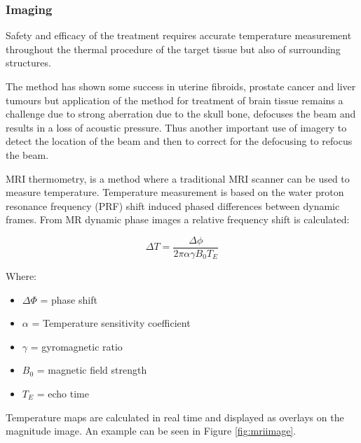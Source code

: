 \documentclass[11pt]{article} %
\begin{document}
	\subsubsection{Imaging}
	Safety and efficacy of the treatment requires accurate temperature measurement throughout the thermal procedure of the target tissue but also of surrounding structures.
	
	The method has shown some success in uterine fibroids, prostate cancer and liver tumours but application of the method for treatment of brain tissue remains a challenge due to strong aberration due to the skull bone, defocuses the beam and results in a loss of acoustic pressure. Thus another important use of imagery to detect the location of the beam and then to correct for the defocusing to refocus the beam. 
	
	MRI thermometry, is a method where a traditional MRI scanner can be used to measure temperature. Temperature measurement is based on the water proton resonance frequency (PRF) shift induced phased differences between dynamic frames. From MR dynamic phase images a relative frequency shift is calculated:
	
	\begin{equation}
	\Delta T= \frac{\Delta \phi}{2 \pi \alpha \gamma B_0 T_E}
	\end{equation}
	
	Where: 
	\begin{itemize}
		\item $\Delta \Phi $ = phase shift 
		\item $\alpha$ = Temperature sensitivity coefficient 
		\item $\gamma$ = gyromagnetic ratio
		\item $B_0$ = magnetic field strength
		\item $T_E$ = echo time 
	\end{itemize}

	Temperature maps are calculated in real time and displayed as overlays on the magnitude image. An example can be seen in Figure \ref{fig:mriimage}.
	
\end{document}
